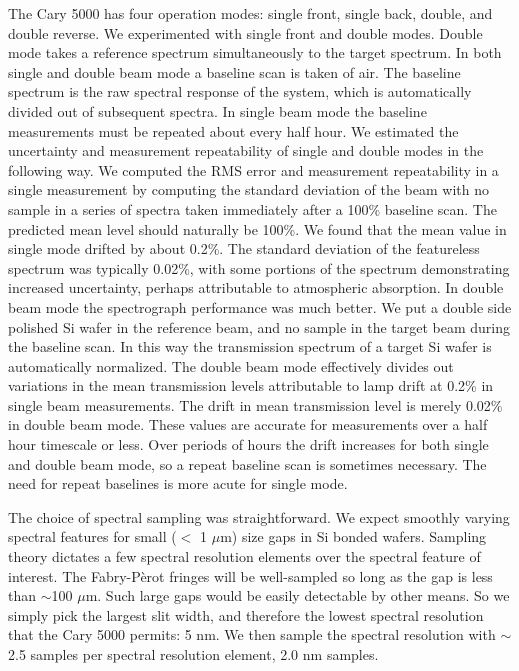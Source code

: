 \documentclass[osajnl,preprint,showpacs,superscriptaddress,12pt]{revtex4-1} %
\begin{document}
The Cary 5000 has four operation modes: single front, single back, double, and double reverse.  We experimented with single front and double modes.  Double mode takes a reference spectrum simultaneously to the target spectrum.  In both single and double beam mode a baseline scan is taken of air.  The baseline spectrum is the raw spectral response of the system, which is automatically divided out of subsequent spectra.  In single beam mode the baseline measurements must be repeated about every half hour.  We estimated the uncertainty and measurement repeatability of single and double modes in the following way.  We computed the RMS error and measurement repeatability in a single measurement by computing the standard deviation of the beam with no sample in a series of spectra taken immediately after a 100\% baseline scan.  The predicted mean level should naturally be 100\%.  We found that the mean value in single mode drifted by about 0.2\%.  The standard deviation of the featureless spectrum was typically 0.02\%, with some portions of the spectrum demonstrating increased uncertainty, perhaps attributable to atmospheric absorption. In double beam mode the spectrograph performance was much better.  We put a double side polished Si wafer in the reference beam, and no sample in the target beam during the baseline scan.  In this way the transmission spectrum of a target Si wafer is automatically normalized.  The double beam mode effectively divides out variations in the mean transmission levels attributable to lamp drift at 0.2\% in single beam measurements.  The drift in mean transmission level is merely 0.02\% in double beam mode.  These values are accurate for measurements over a half hour timescale or less.  Over periods of hours the drift increases for both single and double beam mode, so a repeat baseline scan is sometimes necessary.  The need for repeat baselines is more acute for single mode.


The choice of spectral sampling was straightforward.  We expect smoothly varying spectral features for small ($<$ 1 $\mu$m) size gaps in Si bonded wafers.  Sampling theory dictates a few spectral resolution elements over the spectral feature of interest.  The Fabry-P\`erot fringes will be well-sampled so long as the gap is less than $\sim$100 $\mu$m.  Such large gaps would be easily detectable by other means.  So we simply pick the largest slit width, and therefore the lowest spectral resolution that the Cary 5000 permits: 5 nm.  We then sample the spectral resolution with $\sim$2.5 samples per spectral resolution element, 2.0 nm samples. 
\end{document}
